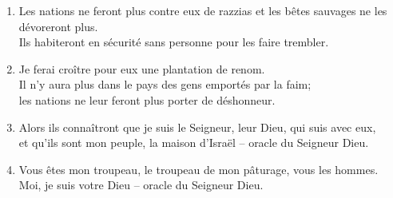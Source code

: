 \documentclass[12pt,a4paper,titlepage]{article}
\def \pslabelsep{0.2em} %
\def \psleftmargin{0em} %
\begin{document}
\begin{enumerate}[leftmargin=\psleftmargin, labelsep = \pslabelsep, label={\arabic*}, font=\color{\pscolor}\small\textsuperscript, parsep=0em, itemsep=0em, topsep=0em ]
\item Les nations ne feront plus contre eux de razzias et les bêtes sauvages ne les dévoreront plus. \\ Ils habiteront en sécurité sans personne pour les faire trembler.
\item Je ferai croître pour eux une plantation de renom. \\ Il n’y aura plus dans le pays des gens emportés par la faim; \\ les nations ne leur feront plus porter de déshonneur.
\item Alors ils connaîtront que je suis le Seigneur, leur Dieu, qui suis avec eux, \\ et qu’ils sont mon peuple, la maison d’Israël – oracle du Seigneur Dieu.
\item Vous êtes mon troupeau, le troupeau de mon pâturage, vous les hommes. \\ Moi, je suis votre Dieu – oracle du Seigneur Dieu.
\end{enumerate}
\newpage
\end{document}
